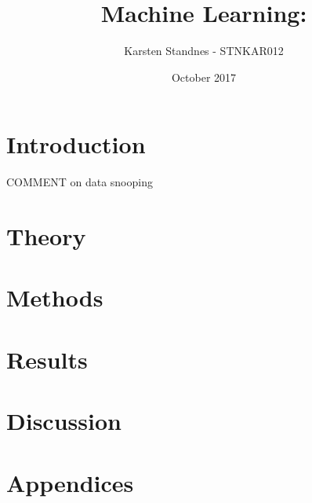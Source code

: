 \documentclass{article}
\title{Machine Learning:  }
\author{Karsten Standnes - STNKAR012}
\date{October 2017}
\begin{document}
	
	\maketitle
	\setlength\parindent{0pt}

	\section{Introduction}
	
	
	
	COMMENT on data snooping
	\newpage
	\tableofcontents
	\newpage 
	 
	\section{Theory}
	
	
	 
	\section{Methods}
	
	
	
	\section{Results}
	
	
	
	\section{Discussion}
	
	\section{Appendices}
	
	
\end{document}
